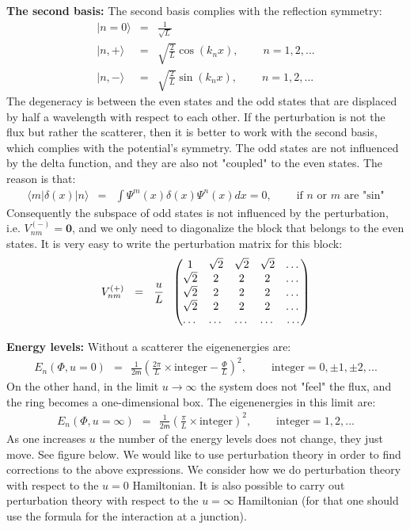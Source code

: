 \documentclass[onecolumn,fleqn, 11pt]{revtex4}
\newcommand{\mass}{\mathsf{m}}
\newcommand{\amatrix}[1]{\begin{matrix} #1 \end{matrix}}
\newcommand{\beq}{\begin{eqnarray}}
\newcommand{\eeq}{\end{eqnarray}}
\begin{document}
 
{\bf The second basis:} 
The second basis complies with the reflection symmetry:
\beq
|n=0\rangle &=& \frac{1}{\sqrt{L}}
\\ \nonumber
| n, + \rangle &=& \sqrt{\frac{2}{L}} \cos(k_n x), \ \ \ \ \ \ \ \ \ \ n=1,2,...
\\ \nonumber
| n, - \rangle &=& \sqrt{\frac{2}{L}} \sin(k_n x), \ \ \ \ \ \ \ \ \ \ n=1,2,...
\eeq
The degeneracy is between the even states 
and the odd states that are displaced by 
half a wavelength with respect to each other. 
If the perturbation is not the flux but 
rather the scatterer, then it is better 
to work with the second basis, which complies 
with the potential's symmetry. The odd states 
are not influenced by the delta function, 
and they are also not "coupled" to the even states. The reason is that:
\beq
\langle m |\delta(x)|n \rangle &=& \int\Psi^m(x)\delta(x)\Psi^n(x)dx=0, 
\ \ \ \ \ \ \ \ \ \ \mbox{if $n$ or $m$ are "sin"}
\eeq
Consequently the subspace of odd states 
is not influenced by the perturbation,
i.e.  ${V_{nm}^{(-)}= \bm{0}}$, 
and we only need to diagonalize 
the block that belongs to the even states. 
It is very easy to write the perturbation 
matrix for this block:
\beq
V_{nm}^{(+)} \ \ = \ \ \frac{u}{L} \ \  
\left( 
\amatrix{
1 & \sqrt{2} & \sqrt{2} & \sqrt{2} & \dots \cr 
\sqrt{2} & 2 & 2 & 2 & \dots \cr 
\sqrt{2} & 2 &2 &2 & \dots \cr 
\sqrt{2} & 2 & 2 & 2 & \dots \cr 
\dots & \dots & \dots & \dots & \dots } 
\right) 
\eeq



{\bf Energy levels:} 
Without a scatterer the eigenenergies are:
\beq
E_n(\Phi, u{=}0)
\ \ = \ \ \frac{1}{2\mass}
\left(\frac{2\pi}{L}\times \mbox{integer}-\frac{\Phi}{L}\right)^2,
\ \ \ \ \ \ \ \ \ \ \mbox{integer}=0,\pm1,\pm2,...
\eeq
On the other hand, in the limit ${u\rightarrow\infty}$ 
the system does not "feel" the flux, and the ring becomes 
a one-dimensional box. The eigenenergies in this limit are:
\beq
E_n(\Phi, u{=}\infty) 
\ \ = \ \ \frac{1}{2\mass}\left(\frac{\pi}{L} \times \mbox{integer}\right)^2,
\ \ \ \ \ \ \ \ \ \ \mbox{integer}=1,2,...
\eeq
As one increases ${u}$ the number of the energy 
levels does not change, they just move. See figure below. 
We would like to use perturbation theory in order 
to find corrections to the above expressions. 
We consider how we do perturbation theory with respect 
to the  ${u{=}0}$ Hamiltonian. It is also possible 
to carry out perturbation theory with respect 
to the  ${u{=}\infty}$ Hamiltonian (for that one 
should use the formula for the interaction at a junction). 
\end{document}
